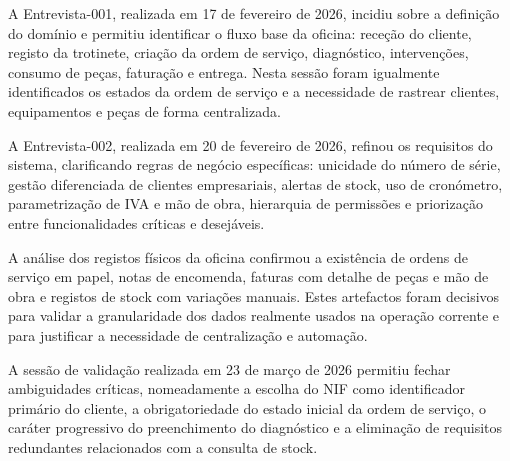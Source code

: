 \documentclass[a4paper,12pt]{scrreprt}
\begin{document}
    A Entrevista-001, realizada em 17 de fevereiro de 2026, incidiu sobre a definição do domínio e permitiu identificar o fluxo base da oficina: receção do cliente, registo da trotinete, criação da ordem de serviço, diagnóstico, intervenções, consumo de peças, faturação e entrega. Nesta sessão foram igualmente identificados os estados da ordem de serviço e a necessidade de rastrear clientes, equipamentos e peças de forma centralizada.

    A Entrevista-002, realizada em 20 de fevereiro de 2026, refinou os requisitos do sistema, clarificando regras de negócio específicas: unicidade do número de série, gestão diferenciada de clientes empresariais, alertas de stock, uso de cronómetro, parametrização de IVA e mão de obra, hierarquia de permissões e priorização entre funcionalidades críticas e desejáveis.

    A análise dos registos físicos da oficina confirmou a existência de ordens de serviço em papel, notas de encomenda, faturas com detalhe de peças e mão de obra e registos de stock com variações manuais. Estes artefactos foram decisivos para validar a granularidade dos dados realmente usados na operação corrente e para justificar a necessidade de centralização e automação.

    A sessão de validação realizada em 23 de março de 2026 permitiu fechar ambiguidades críticas, nomeadamente a escolha do NIF como identificador primário do cliente, a obrigatoriedade do estado inicial da ordem de serviço, o caráter progressivo do preenchimento do diagnóstico e a eliminação de requisitos redundantes relacionados com a consulta de stock.


\end{document}
